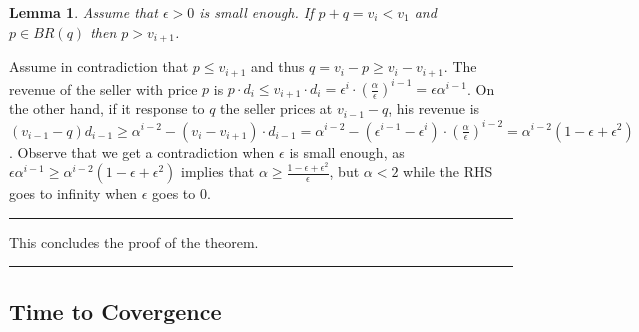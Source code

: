 \documentclass[11pt,a4paper]{article}
\newcommand{\qed}{\rule{1.5mm}{2mm}\vspace{0.1in}}
\newenvironment{proof}{\par\noindent{\bf Proof:}}{\qed}
\newtheorem{lemma}[theorem]{Lemma}
\begin{document}
\begin{proof}
	\begin{lemma}
		\label{lem:very uneven split}
		Assume that $\epsilon>0$ is small enough.
		If $p+q=v_i<v_1$ and $p\in BR(q)$ then $p>v_{i+1}$.
	\end{lemma}  	
	\begin{proof}
		Assume in contradiction that $p\leq v_{i+1}$ and thus $q=v_i-p\geq v_i-v_{i+1}$.
		The revenue of the seller with price $p$ is
		$p\cdot d_i\leq v_{i+1}\cdot d_i = \epsilon^ i \cdot \left(\frac{\alpha}{\epsilon}\right)^{i-1} = \epsilon \alpha^{i-1} $.
		On the other hand, if it response to $q$ the seller prices at $v_{i-1}-q$, his revenue is $(v_{i-1}-q) d_{i-1} \geq  \alpha^{i-2} - (v_i-v_{i+1})\cdot d_{i-1} =
		\alpha^{i-2} - (\epsilon^{i-1}-\epsilon^i)\cdot \left(\frac{\alpha}{\epsilon}\right)^{i-2} =
		\alpha^{i-2} \left(1- \epsilon +\epsilon^2 \right) $.
		Observe that we get a contradiction when $\epsilon$ is small enough, as
		$\epsilon \alpha^{i-1} \geq 	\alpha^{i-2} \left(1- \epsilon +\epsilon^2 \right) $ implies that
		$\alpha \geq \frac{1- \epsilon +\epsilon^2}{\epsilon}$, but $\alpha<2$ while the RHS goes to infinity when $\epsilon$ goes to $0$.
	\end{proof}
	
	This concludes the proof of the theorem.
\end{proof}


\subsection{Time to Covergence}
\label{app:BR-stops-at-time-W}
\end{document}
